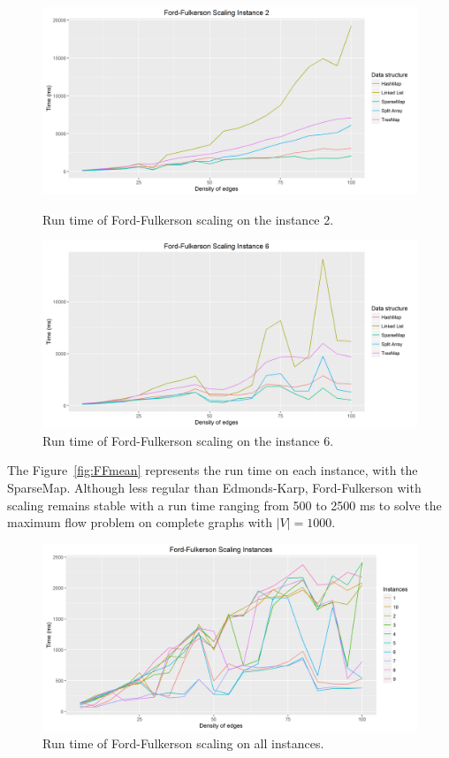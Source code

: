 \begin{figure}[H]
\includegraphics[scale=0.63]{images/FF2.png}
\caption{Run time of Ford-Fulkerson scaling on the instance 2.}
\label{fig:FF2}
\includegraphics[scale=0.63]{images/FF6.png}
\caption{Run time of Ford-Fulkerson scaling on the instance 6.}
\label{fig:FF6}
\end{figure}

The Figure~\ref{fig:FFmean} represents the run time on each instance, with the SparseMap. Although less regular than Edmonds-Karp, Ford-Fulkerson with scaling remains stable with a run time ranging from 500 to 2500 ms to solve the maximum flow problem on complete graphs with $|V|=1000$.

\begin{figure}[H]
\includegraphics[scale=0.65]{images/FFmean.png}
\caption{Run time of Ford-Fulkerson scaling on all instances.}
\label{fig:EKmean}
\end{figure}

